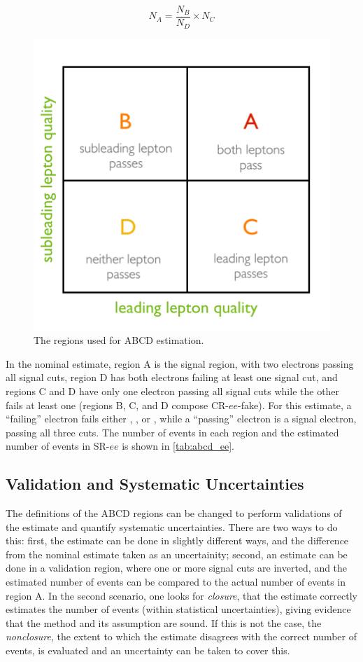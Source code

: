 \begin{equation}
N_A = \frac{N_B}{N_D}\times N_C
\end{equation}


\begin{figure}[!ht]
\centering
\includegraphics[width=.5\textwidth]{figures/otherbackgrounds/abcd.png}
\caption{The regions used for ABCD estimation.}
\label{fig:abcd}
\end{figure}


In the nominal estimate, region A is the signal region, with two electrons passing all signal cuts, region D has both electrons failing at least one signal cut, and regions C and D have only one electron passing all signal cuts while the other fails at least one (regions B, C, and D compose CR-$ee$-fake). For this estimate, a ``failing'' electron fails either \dpt, \chiID, or \nmiss, while a ``passing'' electron is a signal electron, passing all three cuts. The number of events in each region and the estimated number of events in SR-$ee$ is shown in \autoref{tab:abcd_ee}.

\subsection{Validation and Systematic Uncertainties}
The definitions of the ABCD regions can be changed to perform validations of the estimate and quantify systematic uncertainties. There are two ways to do this: first, the estimate can be done in slightly different ways, and the difference from the nominal estimate taken as an uncertainity; second, an estimate can be done in a validation region, where one or more signal cuts are inverted, and the estimated number of events can be compared to the actual number of events in region A. In the second scenario, one looks for \emph{closure}, that the estimate correctly estimates the number of events (within statistical uncertainties), giving evidence that the method and its assumption are sound. If this is not the case, the \emph{nonclosure}, the extent to which the estimate disagrees with the correct number of events, is evaluated and an uncertainty can be taken to cover this.

